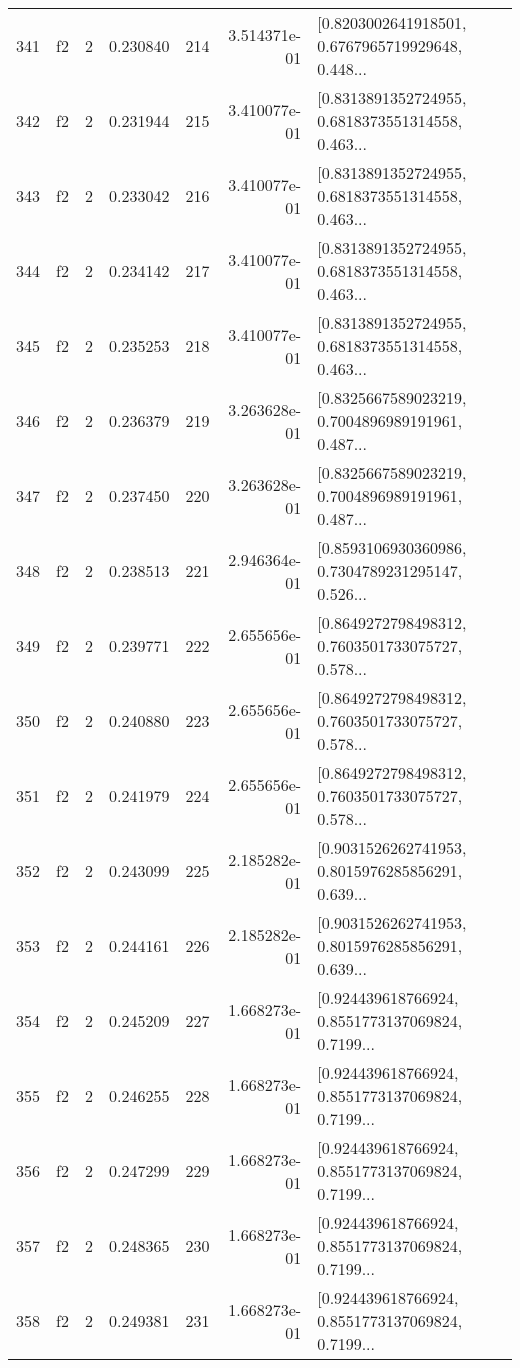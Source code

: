 \begin{tabular}{lllrlrl}
341 &  f2 &   2 &  0.230840 &  214 &  3.514371e-01 &  [0.8203002641918501, 0.6767965719929648, 0.448... \\
342 &  f2 &   2 &  0.231944 &  215 &  3.410077e-01 &  [0.8313891352724955, 0.6818373551314558, 0.463... \\
343 &  f2 &   2 &  0.233042 &  216 &  3.410077e-01 &  [0.8313891352724955, 0.6818373551314558, 0.463... \\
344 &  f2 &   2 &  0.234142 &  217 &  3.410077e-01 &  [0.8313891352724955, 0.6818373551314558, 0.463... \\
345 &  f2 &   2 &  0.235253 &  218 &  3.410077e-01 &  [0.8313891352724955, 0.6818373551314558, 0.463... \\
346 &  f2 &   2 &  0.236379 &  219 &  3.263628e-01 &  [0.8325667589023219, 0.7004896989191961, 0.487... \\
347 &  f2 &   2 &  0.237450 &  220 &  3.263628e-01 &  [0.8325667589023219, 0.7004896989191961, 0.487... \\
348 &  f2 &   2 &  0.238513 &  221 &  2.946364e-01 &  [0.8593106930360986, 0.7304789231295147, 0.526... \\
349 &  f2 &   2 &  0.239771 &  222 &  2.655656e-01 &  [0.8649272798498312, 0.7603501733075727, 0.578... \\
350 &  f2 &   2 &  0.240880 &  223 &  2.655656e-01 &  [0.8649272798498312, 0.7603501733075727, 0.578... \\
351 &  f2 &   2 &  0.241979 &  224 &  2.655656e-01 &  [0.8649272798498312, 0.7603501733075727, 0.578... \\
352 &  f2 &   2 &  0.243099 &  225 &  2.185282e-01 &  [0.9031526262741953, 0.8015976285856291, 0.639... \\
353 &  f2 &   2 &  0.244161 &  226 &  2.185282e-01 &  [0.9031526262741953, 0.8015976285856291, 0.639... \\
354 &  f2 &   2 &  0.245209 &  227 &  1.668273e-01 &  [0.924439618766924, 0.8551773137069824, 0.7199... \\
355 &  f2 &   2 &  0.246255 &  228 &  1.668273e-01 &  [0.924439618766924, 0.8551773137069824, 0.7199... \\
356 &  f2 &   2 &  0.247299 &  229 &  1.668273e-01 &  [0.924439618766924, 0.8551773137069824, 0.7199... \\
357 &  f2 &   2 &  0.248365 &  230 &  1.668273e-01 &  [0.924439618766924, 0.8551773137069824, 0.7199... \\
358 &  f2 &   2 &  0.249381 &  231 &  1.668273e-01 &  [0.924439618766924, 0.8551773137069824, 0.7199... \\

\end{tabular}
